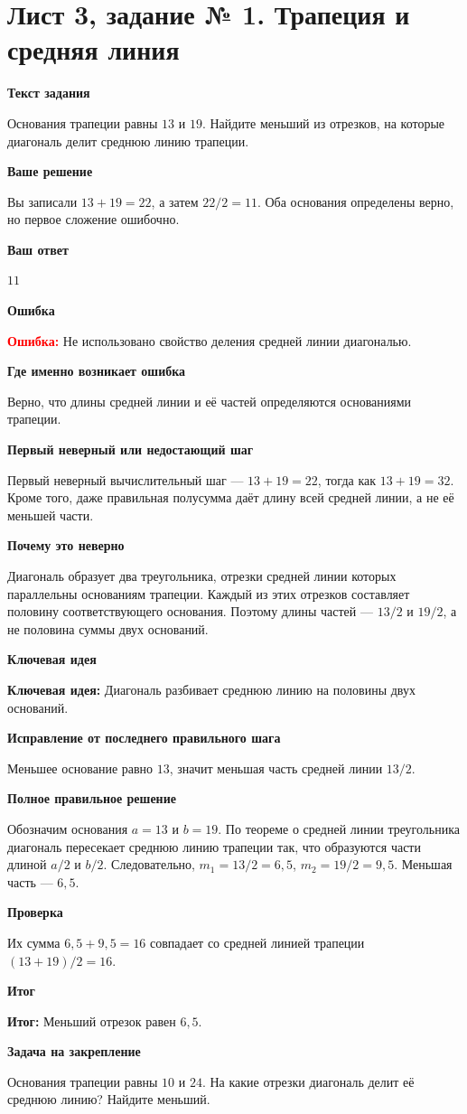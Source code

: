 \documentclass[11pt,a4paper]{article}
\newcommand{\Idea}{\textcolor{blue!60!black}{\textbf{Ключевая идея:}}}
\newcommand{\Res}{\textcolor{teal!60!black}{\textbf{Итог:}}}
\newcommand{\Heading}[2]{\par\medskip\textbf{#1}\par#2\par}
\begin{document}
\section*{Лист 3, задание № 1. Трапеция и средняя линия}
\Heading{Текст задания}{Основания трапеции равны $13$ и $19$. Найдите меньший из отрезков, на которые диагональ делит среднюю линию трапеции.}
\Heading{Ваше решение}{Вы записали $13+19=22$, а затем $22/2=11$. Оба основания определены верно, но первое сложение ошибочно.}
\Heading{Ваш ответ}{$11$}
\Heading{Ошибка}{\textcolor{red}{\textbf{Ошибка:}} Не использовано свойство деления средней линии диагональю.}
\Heading{Где именно возникает ошибка}{Верно, что длины средней линии и её частей определяются основаниями трапеции.}
\Heading{Первый неверный или недостающий шаг}{Первый неверный вычислительный шаг --- $13+19=22$, тогда как $13+19=32$. Кроме того, даже правильная полусумма даёт длину всей средней линии, а не её меньшей части.}
\Heading{Почему это неверно}{Диагональ образует два треугольника, отрезки средней линии которых параллельны основаниям трапеции. Каждый из этих отрезков составляет половину соответствующего основания. Поэтому длины частей --- $13/2$ и $19/2$, а не половина суммы двух оснований.}
\Heading{Ключевая идея}{\Idea{} Диагональ разбивает среднюю линию на половины двух оснований.}
\Heading{Исправление от последнего правильного шага}{Меньшее основание равно $13$, значит меньшая часть средней линии $13/2$.}
\Heading{Полное правильное решение}{Обозначим основания $a=13$ и $b=19$. По теореме о средней линии треугольника диагональ пересекает среднюю линию трапеции так, что образуются части длиной $a/2$ и $b/2$. Следовательно, $m_1=13/2=6{,}5$, $m_2=19/2=9{,}5$. Меньшая часть --- $6{,}5$.}
\Heading{Проверка}{Их сумма $6{,}5+9{,}5=16$ совпадает со средней линией трапеции $(13+19)/2=16$.}
\Heading{Итог}{\Res{} Меньший отрезок равен $6{,}5$.}
\Heading{Задача на закрепление}{Основания трапеции равны $10$ и $24$. На какие отрезки диагональ делит её среднюю линию? Найдите меньший.}
\newpage
{}\label{task:3_4}
\end{document}
